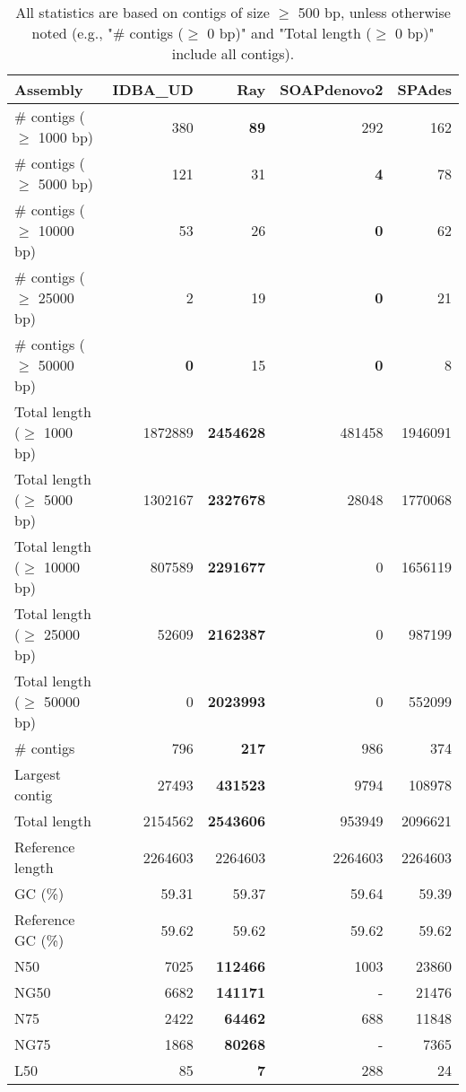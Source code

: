 \documentclass[12pt,a4paper]{article}
\begin{document}
\begin{table}[ht]
\begin{center}
\caption{All statistics are based on contigs of size $\geq$ 500 bp, unless otherwise noted (e.g., "\# contigs ($\geq$ 0 bp)" and "Total length ($\geq$ 0 bp)" include all contigs).}
\begin{tabular}{|l*{4}{|r}|}
\hline
Assembly & IDBA\_UD & Ray & SOAPdenovo2 & SPAdes \\ \hline
\# contigs ($\geq$ 1000 bp) & 380 & {\bf 89} & 292 & 162 \\ \hline
\# contigs ($\geq$ 5000 bp) & 121 & 31 & {\bf 4} & 78 \\ \hline
\# contigs ($\geq$ 10000 bp) & 53 & 26 & {\bf 0} & 62 \\ \hline
\# contigs ($\geq$ 25000 bp) & 2 & 19 & {\bf 0} & 21 \\ \hline
\# contigs ($\geq$ 50000 bp) & {\bf 0} & 15 & {\bf 0} & 8 \\ \hline
Total length ($\geq$ 1000 bp) & 1872889 & {\bf 2454628} & 481458 & 1946091 \\ \hline
Total length ($\geq$ 5000 bp) & 1302167 & {\bf 2327678} & 28048 & 1770068 \\ \hline
Total length ($\geq$ 10000 bp) & 807589 & {\bf 2291677} & 0 & 1656119 \\ \hline
Total length ($\geq$ 25000 bp) & 52609 & {\bf 2162387} & 0 & 987199 \\ \hline
Total length ($\geq$ 50000 bp) & 0 & {\bf 2023993} & 0 & 552099 \\ \hline
\# contigs & 796 & {\bf 217} & 986 & 374 \\ \hline
Largest contig & 27493 & {\bf 431523} & 9794 & 108978 \\ \hline
Total length & 2154562 & {\bf 2543606} & 953949 & 2096621 \\ \hline
Reference length & 2264603 & 2264603 & 2264603 & 2264603 \\ \hline
GC (\%) & 59.31 & 59.37 & 59.64 & 59.39 \\ \hline
Reference GC (\%) & 59.62 & 59.62 & 59.62 & 59.62 \\ \hline
N50 & 7025 & {\bf 112466} & 1003 & 23860 \\ \hline
NG50 & 6682 & {\bf 141171} & - & 21476 \\ \hline
N75 & 2422 & {\bf 64462} & 688 & 11848 \\ \hline
NG75 & 1868 & {\bf 80268} & - & 7365 \\ \hline
L50 & 85 & {\bf 7} & 288 & 24 \\ \hline

\end{tabular}
\end{center}
\end{table}
\end{document}
